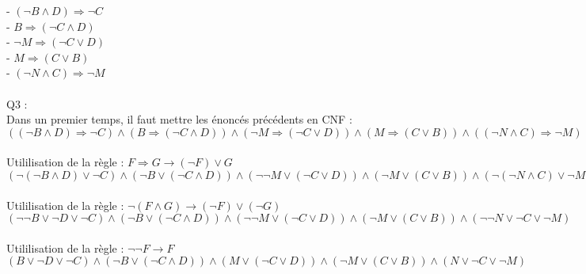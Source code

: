 \documentclass{article}
\begin{document}
- $(\neg B \land D) \Rightarrow \neg C$
\newline
\\
- $B \Rightarrow (\neg C \land D)$
\newline
\\
- $\neg M \Rightarrow (\neg C \lor D)$
\newline
\\
- $M \Rightarrow (C \lor B)$
\newline
\\
- $(\neg N \land C) \Rightarrow \neg M$
\newline
\\
\\
Q3 :
\newline
\\
Dans un premier temps, il faut mettre les énoncés précédents en CNF :
\newline
\\
$((\neg B \land D) \Rightarrow \neg C) \land (B \Rightarrow (\neg C \land D)) \land (\neg M \Rightarrow (\neg C \lor D)) \land (M \Rightarrow (C \lor B)) \land ((\neg N \land C) \Rightarrow \neg M)$
\newline
\\
\\
Utililisation de la règle : $F \Rightarrow G \rightarrow (\neg F) \lor G$
\newline
\\
$(\neg (\neg B \land D) \lor \neg C) \land (\neg B \lor (\neg C \land D)) \land (\neg\neg M \lor (\neg C \lor D)) \land (\neg M \lor (C \lor B)) \land (\neg(\neg N \land C) \lor \neg M)$
\newline
\\
\\
Utililisation de la règle : $\neg (F \land G) \rightarrow (\neg F) \lor (\neg G)$
\newline
\\
$(\neg \neg B \lor \neg D \lor \neg C) \land (\neg B \lor (\neg C \land D)) \land (\neg\neg M \lor (\neg C \lor D)) \land (\neg M \lor (C \lor B)) \land (\neg\neg N \lor \neg C \lor \neg M)$
\newline
\\
\\
Utililisation de la règle : $\neg\neg F \rightarrow F$
\newline
\\
$(B \lor \neg D \lor \neg C) \land (\neg B \lor (\neg C \land D)) \land (M \lor (\neg C \lor D)) \land (\neg M \lor (C \lor B)) \land (N \lor \neg C \lor \neg M)$
\newline
\end{document}
